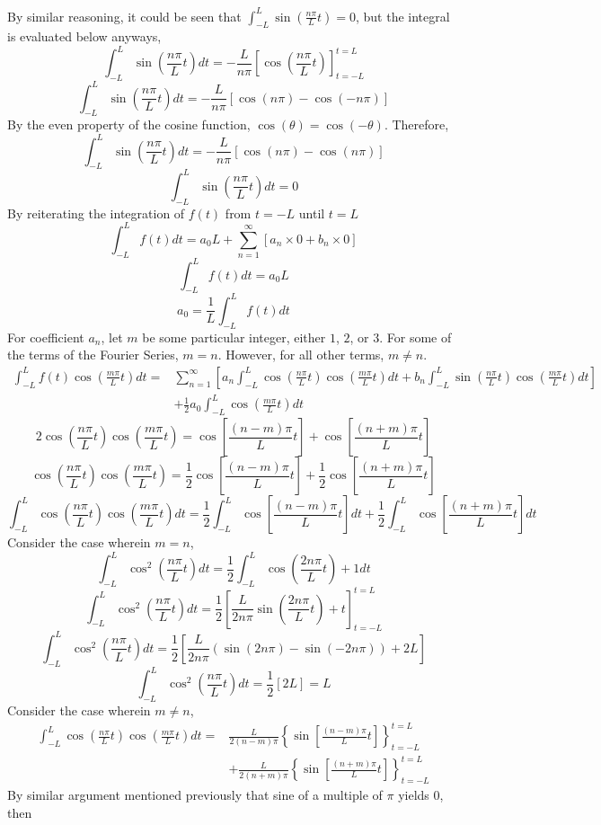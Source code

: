 \documentclass[a4paper, 12pt]{report}
\def\t{\theta}
\def\f{\frac}
\def\l{\left}
\def\r{\right}
\def\dst{\displaystyle}
\begin{document}
\begin{center}
By similar reasoning, it could be seen that $\dst{\int_{-L}^{L}\sin\l(\f{n\pi}{L}t\r) = 0}$, but the integral is evaluated below anyways,
$$\int_{-L}^{L}\sin\l(\f{n\pi}{L}t\r)dt = -\f{L}{n\pi}\l[\cos\l(\f{n\pi}{L}t\r)\r]^{t = L}_{t = -L}$$
$$\int_{-L}^{L}\sin\l(\f{n\pi}{L}t\r)dt = -\f{L}{n\pi}\l[\cos\l(n\pi\r) - \cos\l(-n\pi\r)\r]$$
By the even property of the cosine function, $\cos(\t) = \cos(-\t)$. Therefore,
$$\int_{-L}^{L}\sin\l(\f{n\pi}{L}t\r)dt = -\f{L}{n\pi}\l[\cos\l(n\pi\r) - \cos\l(n\pi\r)\r]$$
$$\int_{-L}^{L}\sin\l(\f{n\pi}{L}t\r)dt = 0$$
By reiterating the integration of $f(t)$ from $t = -L$ until $t = L$
$$\int_{-L}^{L}f(t)dt = a_0L + \sum_{n = 1}^{\infty}\l[a_n\times 0 + b_n \times 0\r]$$
$$\int_{-L}^{L}f(t)dt = a_0L$$
$$a_0 = \f{1}{L}\int_{-L}^{L}f(t)dt$$
For coefficient $a_n$, let $m$ be some particular integer, either $1$, $2$, or $3$. For some of the terms of the Fourier Series, $m = n$. However, for all other terms, $m\neq n$.
\begin{align*}
\int_{-L}^{L}f(t)\cos\l(\f{m\pi}{L}t\r)dt = &\sum_{n = 1}^{\infty}\l[a_n \int_{-L}^{L}\cos\l(\f{n\pi}{L}t\r)\cos\l(\f{m\pi}{L}t\r)dt + b_n \int_{-L}^{L}\sin\l(\f{n\pi}{L}t\r)\cos\l(\f{m\pi}{L}t\r)dt\r] \\ &+ \f{1}{2}a_0 \int_{-L}^{L}\cos\l(\f{m\pi}{L}t\r)dt
\end{align*}
$$2\cos\l(\f{n\pi}{L}t\r)\cos\l(\f{m\pi}{L}t\r) = \cos\l[\f{(n-m)\pi}{L}t\r] + \cos\l[\f{(n+m)\pi}{L}t\r]$$
$$\cos\l(\f{n\pi}{L}t\r)\cos\l(\f{m\pi}{L}t\r) = \f{1}{2}\cos\l[\f{(n-m)\pi}{L}t\r] + \f{1}{2}\cos\l[\f{(n+m)\pi}{L}t\r]$$
$$\int_{-L}^{L}\cos\l(\f{n\pi}{L}t\r)\cos\l(\f{m\pi}{L}t\r)dt = \f{1}{2}\int_{-L}^{L}\cos\l[\f{(n-m)\pi}{L}t\r]dt + \f{1}{2}\int_{-L}^{L}\cos\l[\f{(n+m)\pi}{L}t\r]dt$$
Consider the case wherein $m = n$,
$$\int_{-L}^{L}\cos^2\l(\f{n\pi}{L}t\r)dt = \f{1}{2}\int_{-L}^{L}\cos\l(\f{2n\pi}{L}t\r) + 1dt$$
$$\int_{-L}^{L}\cos^2\l(\f{n\pi}{L}t\r)dt = \f{1}{2}\l[\f{L}{2n\pi}\sin\l(\f{2n\pi}{L}t\r) + t\r]^{t = L}_{t = -L}$$
$$\int_{-L}^{L}\cos^2\l(\f{n\pi}{L}t\r)dt = \f{1}{2}\l[\f{L}{2n\pi}\l(\sin\l(2n\pi\r) - \sin\l(-2n\pi\r)\r) + 2L\r]$$
$$\int_{-L}^{L}\cos^2\l(\f{n\pi}{L}t\r)dt = \f{1}{2}\l[2L\r] = L$$
Consider the case wherein $m\neq n$,
\begin{align*}
\int_{-L}^{L}\cos\l(\f{n\pi}{L}t\r)\cos\l(\f{m\pi}{L}t\r)dt = & \f{L}{2(n-m)\pi}\l\{\sin\l[\f{(n-m)\pi}{L}t\r]\r\}_{t = -L}^{t = L} \\ & + \f{L}{2(n+m)\pi}\l\{\sin\l[\f{(n+m)\pi}{L}t\r]\r\}_{t = -L}^{t = L}
\end{align*}
By similar argument mentioned previously that sine of a multiple of $\pi$ yields $0$, then

\end{center}
\end{document}
